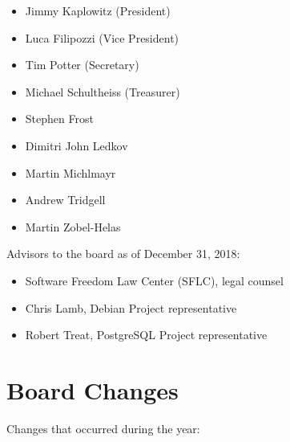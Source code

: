 \documentclass[a4paper]{report}
\begin{document}
\begin{itemize}
\item Jimmy Kaplowitz (President)
\item Luca Filipozzi (Vice President)
\item Tim Potter (Secretary)
\item Michael Schultheiss (Treasurer)
\item Stephen Frost
\item Dimitri John Ledkov
\item Martin Michlmayr
\item Andrew Tridgell
\item Martin Zobel-Helas
\end{itemize}

Advisors to the board as of December 31, 2018:

\begin{itemize}
\item Software Freedom Law Center (SFLC), legal counsel
\item Chris Lamb, Debian Project representative
\item Robert Treat, PostgreSQL Project representative
\end{itemize}

\section{Board Changes}

Changes that occurred during the year:
\end{document}
